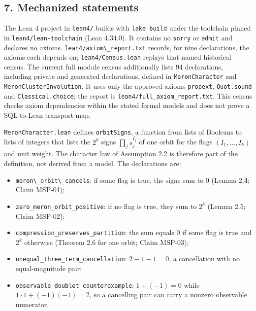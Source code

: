 \documentclass[
  11pt,
]{article}
\newcommand{\passthrough}[1]{#1}
\providecommand{\tightlist}{%
  \setlength{\itemsep}{0pt}\setlength{\parskip}{0pt}}
\begin{document}
\subsection{7. Mechanized statements}\label{mechanized-statements}

The Lean 4 project in \passthrough{\lstinline!lean4/!} builds with
\passthrough{\lstinline!lake build!} under the toolchain pinned in
\passthrough{\lstinline!lean4/lean-toolchain!} (Lean 4.34.0). It
contains no \passthrough{\lstinline!sorry!} or
\passthrough{\lstinline!admit!} and declares no axioms.
\passthrough{\lstinline!lean4/axiom\_report.txt!} records, for nine
declarations, the axioms each depends on;
\passthrough{\lstinline!lean4/Census.lean!} replays that named
historical census. The current full module census additionally lists 94
declarations, including private and generated declarations, defined in
\passthrough{\lstinline!MeronCharacter!} and
\passthrough{\lstinline!MeronClusterInvolution!}. It uses only the
approved axioms \passthrough{\lstinline!propext!},
\passthrough{\lstinline!Quot.sound!} and
\passthrough{\lstinline!Classical.choice!}; the report is
\nolinkurl{lean4/full_axiom_report.txt}. This census checks axiom
dependencies within the stated formal models and does not prove a
SQL-to-Lean transport map.

\passthrough{\lstinline!MeronCharacter.lean!} defines
\passthrough{\lstinline!orbitSigns!}, a function from lists of Booleans
to lists of integers that lists the \(2^k\) signs \(\prod_j s_j^{I_j}\)
of one orbit for the flags \((I_1, \dots, I_k)\) and unit weight. The
character law of Assumption 2.2 is therefore part of the definition, not
derived from a model. The declarations are:

\begin{itemize}
\tightlist
\item
  \passthrough{\lstinline!meron\_orbit\_cancels!}: if some flag is true,
  the signs sum to 0 (Lemma 2.4; Claim MSP-01);
\item
  \nolinkurl{zero_meron_orbit_positive}: if no flag is true, they sum to
  \(2^k\) (Lemma 2.5; Claim MSP-02);
\item
  \nolinkurl{compression_preserves_partition}: the sum equals 0 if some
  flag is true and \(2^k\) otherwise (Theorem 2.6 for one orbit; Claim
  MSP-03);
\item
  \nolinkurl{unequal_three_term_cancellation}: \(2 - 1 - 1 = 0\), a
  cancellation with no equal-magnitude pair;
\item
  \nolinkurl{observable_doublet_counterexample}: \(1 + (-1) = 0\) while
  \(1 \cdot 1 + (-1)(-1) = 2\), so a cancelling pair can carry a nonzero
  observable numerator.
\end{itemize}
\end{document}
